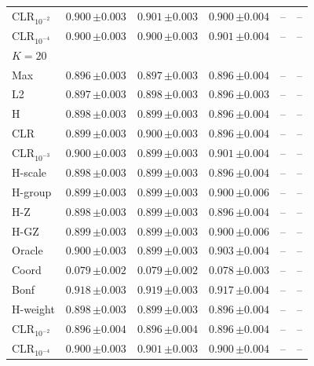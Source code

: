 \begin{tabular}{lccccc}
CLR$_{10^{-2}}$ & $0.900\,{\scriptstyle\pm 0.003}$ & $0.901\,{\scriptstyle\pm 0.003}$ & $0.900\,{\scriptstyle\pm 0.004}$ & -- & -- \\
CLR$_{10^{-4}}$ & $0.900\,{\scriptstyle\pm 0.003}$ & $0.900\,{\scriptstyle\pm 0.003}$ & $0.901\,{\scriptstyle\pm 0.004}$ & -- & -- \\
\midrule
\multicolumn{6}{l}{$K=20$} \\
Max & $0.896\,{\scriptstyle\pm 0.003}$ & $0.897\,{\scriptstyle\pm 0.003}$ & $0.896\,{\scriptstyle\pm 0.004}$ & -- & -- \\
L2 & $0.897\,{\scriptstyle\pm 0.003}$ & $0.898\,{\scriptstyle\pm 0.003}$ & $0.896\,{\scriptstyle\pm 0.003}$ & -- & -- \\
H & $0.898\,{\scriptstyle\pm 0.003}$ & $0.899\,{\scriptstyle\pm 0.003}$ & $0.896\,{\scriptstyle\pm 0.004}$ & -- & -- \\
CLR & $0.899\,{\scriptstyle\pm 0.003}$ & $0.900\,{\scriptstyle\pm 0.003}$ & $0.896\,{\scriptstyle\pm 0.004}$ & -- & -- \\
CLR$_{10^{-3}}$ & $0.900\,{\scriptstyle\pm 0.003}$ & $0.899\,{\scriptstyle\pm 0.003}$ & $0.901\,{\scriptstyle\pm 0.004}$ & -- & -- \\
H-scale & $0.898\,{\scriptstyle\pm 0.003}$ & $0.899\,{\scriptstyle\pm 0.003}$ & $0.896\,{\scriptstyle\pm 0.004}$ & -- & -- \\
H-group & $0.899\,{\scriptstyle\pm 0.003}$ & $0.899\,{\scriptstyle\pm 0.003}$ & $0.900\,{\scriptstyle\pm 0.006}$ & -- & -- \\
H-Z & $0.898\,{\scriptstyle\pm 0.003}$ & $0.899\,{\scriptstyle\pm 0.003}$ & $0.896\,{\scriptstyle\pm 0.004}$ & -- & -- \\
H-GZ & $0.899\,{\scriptstyle\pm 0.003}$ & $0.899\,{\scriptstyle\pm 0.003}$ & $0.900\,{\scriptstyle\pm 0.006}$ & -- & -- \\
Oracle & $0.900\,{\scriptstyle\pm 0.003}$ & $0.899\,{\scriptstyle\pm 0.003}$ & $0.903\,{\scriptstyle\pm 0.004}$ & -- & -- \\
Coord & $0.079\,{\scriptstyle\pm 0.002}$ & $0.079\,{\scriptstyle\pm 0.002}$ & $0.078\,{\scriptstyle\pm 0.003}$ & -- & -- \\
Bonf & $0.918\,{\scriptstyle\pm 0.003}$ & $0.919\,{\scriptstyle\pm 0.003}$ & $0.917\,{\scriptstyle\pm 0.004}$ & -- & -- \\
H-weight & $0.898\,{\scriptstyle\pm 0.003}$ & $0.899\,{\scriptstyle\pm 0.003}$ & $0.896\,{\scriptstyle\pm 0.004}$ & -- & -- \\
CLR$_{10^{-2}}$ & $0.896\,{\scriptstyle\pm 0.004}$ & $0.896\,{\scriptstyle\pm 0.004}$ & $0.896\,{\scriptstyle\pm 0.004}$ & -- & -- \\
CLR$_{10^{-4}}$ & $0.900\,{\scriptstyle\pm 0.003}$ & $0.901\,{\scriptstyle\pm 0.003}$ & $0.900\,{\scriptstyle\pm 0.004}$ & -- & -- \\
\bottomrule
\end{tabular}
